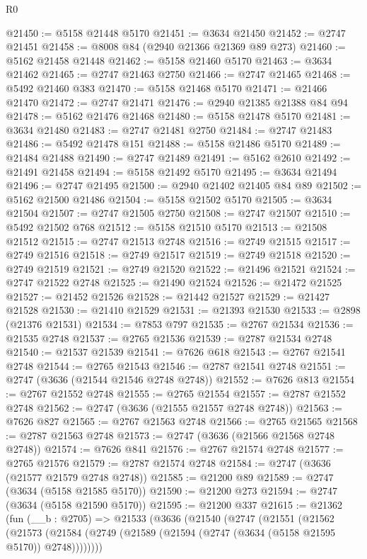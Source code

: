 \begin{lexlean}{R0}
\begin{coremodule}
@21450 := @5158 @21448 @5170
@21451 := @3634 @21450
@21452 := @2747 @21451
@21458 := @8008 @84 (@2940 @21366 @21369 @89 @273)
@21460 := @5162 @21458 @21448
@21462 := @5158 @21460 @5170
@21463 := @3634 @21462
@21465 := @2747 @21463 @2750
@21466 := @2747 @21465
@21468 := @5492 @21460 @383
@21470 := @5158 @21468 @5170
@21471 := @21466 @21470
@21472 := @2747 @21471
@21476 := @2940 @21385 @21388 @84 @94
@21478 := @5162 @21476 @21468
@21480 := @5158 @21478 @5170
@21481 := @3634 @21480
@21483 := @2747 @21481 @2750
@21484 := @2747 @21483
@21486 := @5492 @21478 @151
@21488 := @5158 @21486 @5170
@21489 := @21484 @21488
@21490 := @2747 @21489
@21491 := @5162 @2610
@21492 := @21491 @21458
@21494 := @5158 @21492 @5170
@21495 := @3634 @21494
@21496 := @2747 @21495
@21500 := @2940 @21402 @21405 @84 @89
@21502 := @5162 @21500 @21486
@21504 := @5158 @21502 @5170
@21505 := @3634 @21504
@21507 := @2747 @21505 @2750
@21508 := @2747 @21507
@21510 := @5492 @21502 @768
@21512 := @5158 @21510 @5170
@21513 := @21508 @21512
@21515 := @2747 @21513 @2748
@21516 := @2749 @21515
@21517 := @2749 @21516
@21518 := @2749 @21517
@21519 := @2749 @21518
@21520 := @2749 @21519
@21521 := @2749 @21520
@21522 := @21496 @21521
@21524 := @2747 @21522 @2748
@21525 := @21490 @21524
@21526 := @21472 @21525
@21527 := @21452 @21526
@21528 := @21442 @21527
@21529 := @21427 @21528
@21530 := @21410 @21529
@21531 := @21393 @21530
@21533 := @2898 (@21376 @21531)
@21534 := @7853 @797
@21535 := @2767 @21534
@21536 := @21535 @2748
@21537 := @2765 @21536
@21539 := @2787 @21534 @2748
@21540 := @21537 @21539
@21541 := @7626 @618
@21543 := @2767 @21541 @2748
@21544 := @2765 @21543
@21546 := @2787 @21541 @2748
@21551 := @2747 (@3636 (@21544 @21546 @2748 @2748))
@21552 := @7626 @813
@21554 := @2767 @21552 @2748
@21555 := @2765 @21554
@21557 := @2787 @21552 @2748
@21562 := @2747 (@3636 (@21555 @21557 @2748 @2748))
@21563 := @7626 @827
@21565 := @2767 @21563 @2748
@21566 := @2765 @21565
@21568 := @2787 @21563 @2748
@21573 := @2747 (@3636 (@21566 @21568 @2748 @2748))
@21574 := @7626 @841
@21576 := @2767 @21574 @2748
@21577 := @2765 @21576
@21579 := @2787 @21574 @2748
@21584 := @2747 (@3636 (@21577 @21579 @2748 @2748))
@21585 := @21200 @89
@21589 := @2747 (@3634 (@5158 @21585 @5170))
@21590 := @21200 @273
@21594 := @2747 (@3634 (@5158 @21590 @5170))
@21595 := @21200 @337
@21615 := @21362
    (fun (__b : @2705) =>
    @21533
      (@3636
        (@21540
          (@2747
            (@21551
              (@21562
                (@21573
                  (@21584 (@2749 (@21589 (@21594 (@2747 (@3634 (@5158 @21595 @5170)) @2748))))))))

\end{coremodule}
\end{lexlean}
